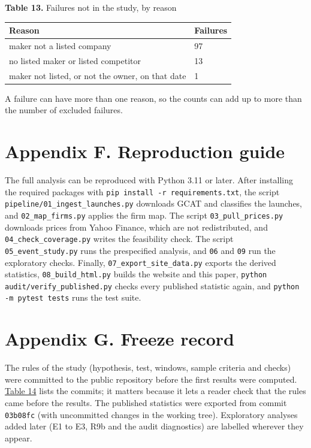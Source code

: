 \documentclass[12pt,a4paper]{article}
\begin{document}
\par\noindent\begin{minipage}{\textwidth}\hypertarget{tab-why}{}
\textbf{Table 13.} Failures not in the study, by reason

{\small\setlength{\tabcolsep}{4pt}\begin{tabularx}{\textwidth}{Xl}
\toprule
\textbf{Reason} & \textbf{Failures} \\
\midrule
maker not a listed company & 97 \\
no listed maker or listed competitor & 13 \\
maker not listed, or not the owner, on that date & 1 \\
\bottomrule
\end{tabularx}}
\vspace{6pt}

A failure can have more than one reason, so the counts can add up to more than the number of excluded failures.

\end{minipage}\par\vspace{4pt}

\section*{\hypertarget{apx-f}{}Appendix F. Reproduction guide}
The full analysis can be reproduced with Python 3.11 or later. After installing the required packages with \texttt{pip install -r requirements.txt}, the script \texttt{pipeline/\allowbreak{}01\_\allowbreak{}ingest\_\allowbreak{}launches.py} downloads GCAT and classifies the launches, and \texttt{02\_\allowbreak{}map\_\allowbreak{}firms.py} applies the firm map. The script \texttt{03\_\allowbreak{}pull\_\allowbreak{}prices.py} downloads prices from Yahoo Finance, which are not redistributed, and \texttt{04\_\allowbreak{}check\_\allowbreak{}coverage.py} writes the feasibility check. The script \texttt{05\_\allowbreak{}event\_\allowbreak{}study.py} runs the prespecified analysis, and \texttt{06} and \texttt{09} run the exploratory checks. Finally, \texttt{07\_\allowbreak{}export\_\allowbreak{}site\_\allowbreak{}data.py} exports the derived statistics, \texttt{08\_\allowbreak{}build\_\allowbreak{}html.py} builds the website and this paper, \texttt{python audit/\allowbreak{}verify\_\allowbreak{}published.py} checks every published statistic again, and \texttt{python -m pytest tests} runs the test suite.

\section*{\hypertarget{apx-g}{}Appendix G. Freeze record}
The rules of the study (hypothesis, test, windows, sample criteria and checks) were committed to the public repository before the first results were computed. \hyperlink{tab-freeze}{Table 14} lists the commits; it matters because it lets a reader check that the rules came before the results. The published statistics were exported from commit \texttt{03b08fc} (with uncommitted changes in the working tree). Exploratory analyses added later (E1 to E3, R9b and the audit diagnostics) are labelled wherever they appear.
\end{document}
